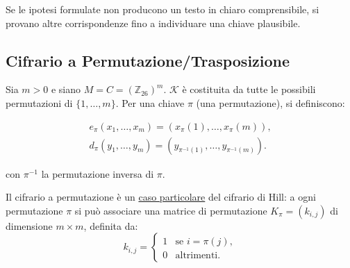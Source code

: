 \noindent Se le ipotesi formulate non producono un testo in chiaro
comprensibile, si provano altre corrispondenze fino a individuare
una chiave plausibile.

\subsection{Cifrario a Permutazione/Trasposizione}
Sia $m>0$ e siano $M = C = (\mathbb{Z}_{26})^m$. $\mathcal{K}$ è costituita da tutte le possibili permutazioni di $\{1,\dots, m\}$. 
Per una chiave $\pi$ (una permutazione), si definiscono:

 \begin{align*}
            e_\pi(x_1,\dots,x_m) = (x_\pi(1),\dots, x_\pi(m)),\\    
            d_\pi(y_1,\dots,y_m) = (y_{\pi^{-1}(1)}, \dots, y_{\pi^{-1}(m)}).
\end{align*}

\noindent con $\pi^{-1}$ la permutazione inversa di $\pi$.  

\vspace{1em}
\noindent
Il cifrario a permutazione è un \underline{caso particolare} del cifrario
di Hill: a ogni permutazione $\pi$ si può associare una matrice
di permutazione $K_\pi=(k_{i,j})$ di dimensione $m\times m$,
definita da:
\[
k_{i,j}=
\begin{cases}
1 & \text{se } i=\pi(j),\\
0 & \text{altrimenti}.
\end{cases}
\]



